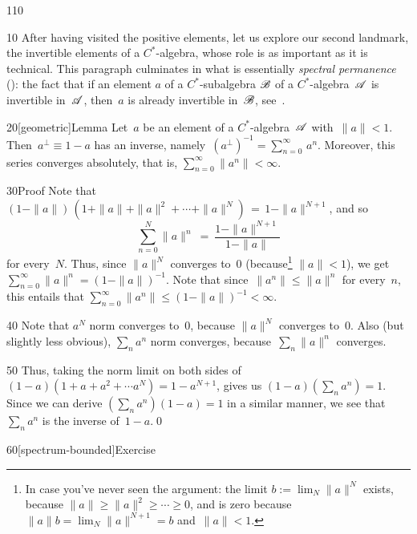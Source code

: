%
%
\begin{parsec}{110}%
\begin{point}{10}%
After having visited the positive elements,
let us explore our second landmark,
the  invertible elements
of a $C^*$-algebra,
whose role 
is as important as it is technical.
This paragraph culminates in what is essentially
 \emph{spectral permanence} ():
the fact that if an element $a$ of a $C^*$-subalgebra $\mathscr{B}$
of a $C^*$-algebra~$\mathscr{A}$
is invertible in~$\mathscr{A}$,
then~$a$ is already invertible in~$\mathscr{B}$,
see~.
\end{point}
\begin{point}{20}[geometric]{Lemma}%
%
Let~$a$ be an element of a $C^*$-algebra~$\mathscr{A}$ with~$\|a\|<1$.
Then~$a^\perp\equiv 1-a$ has an inverse,
namely~$(a^\perp)^{-1}= \sum_{n=0}^\infty\, a^n$.
Moreover, this series converges absolutely,
that is,
$\sum_{n=0}^\infty \|a^n\|<\infty$.
\begin{point}{30}{Proof}%
Note that
$(1-\|a\|)\,(1+\|a\|+\|a\|^2+\dotsb+\|a\|^N) \,=\, 1-\|a\|^{N+1}$,
and so 
\begin{equation*}
\sum_{n=0}^N \|a\|^n \ =\  \frac{1-\|a\|^{N+1}}{1-\|a\|}
\end{equation*}
for every~$N$.
Thus,
since $\|a\|^N$ converges to~$0$
(because\footnote{
In case you've never seen the argument:
the limit $b:=\lim_N \|a\|^N$
exists, because $\|a\|\geq \|a\|^2\geq \dotsb\geq 0$,
and is zero
because $\|a\|b=\lim_N \|a\|^{N+1}=b$
and~$\|a\| < 1$.}
 $\|a\|<1$),
we  get $\sum_{n=0}^\infty \|a\|^n = (1-\|a\|)^{-1}$.
Note that since~$\|a^n\|\leq \|a\|^n$ for every~$n$,
    this entails that $\sum_{n=0}^\infty \|a^n\|\leq (1-\|a\|)^{-1}
    <\infty$.
\begin{point}{40}%
Note that $a^N$ norm converges to~$0$,
because $\|a\|^N$ converges to~$0$.
Also (but slightly less obvious),
$\sum_n a^n$ norm converges,
because~$\sum_n \|a\|^n$ converges.
\end{point}
\begin{point}{50}%
Thus, taking the norm limit
on both sides of $(1-a)(1+a+a^2+\dotsb a^N) = 1-a^{N+1}$,
gives us $(1-a)(\sum_n a^n) = 1$.
Since we can derive $(\sum_n a^n)(1-a) = 1$
in a similar manner, 
we see that $\sum_n a^n$ is the inverse of~$1-a$.\qed
\end{point}
\end{point}
\end{point}
\begin{point}{60}[spectrum-bounded]{Exercise}%

\end{point}
\end{parsec}
